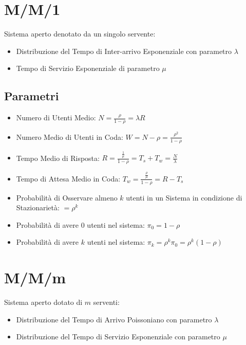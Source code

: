 
\section{M/M/1}

Sistema aperto denotato da un singolo servente:

\begin{itemize}
    \item Distribuzione del Tempo di Inter-arrivo Esponenziale con parametro
          $\lambda$
    \item Tempo di Servizio Esponenziale di parametro $\mu$
\end{itemize}

\subsection{Parametri}

\begin{itemize}
    \item Numero di Utenti Medio: $N = \frac{\rho}{1 - \rho} = \lambda R$
    \item Numero Medio di Utenti in Coda: $W = N - \rho = \frac{\rho^2}{1-\rho}$
    \item Tempo Medio di Risposta: $R = \frac{\frac{1}{\mu}}{1 - \rho} = T_s +
              T_w = \frac{N}{\lambda}$
    \item Tempo di Attesa Medio in Coda: $T_w = \frac{\frac{\rho}{\mu}}{1 -
                  \rho} = R - T_s$
    \item Probabilità di Osservare almeno $k$ utenti in un Sistema in condizione
          di Stazionarietà: $ = \rho^k$
    \item Probabilità di avere $0$ utenti nel sistema: $\pi_0 = 1 - \rho$
    \item Probabilità di avere $k$ utenti nel sistema: $\pi_k = \rho^k \pi_0 =
              \rho^k (1 - \rho)$
\end{itemize}

\section{M/M/m}

Sistema aperto dotato di $m$ serventi:

\begin{itemize}
    \item Distribuzione del Tempo di Arrivo Poissoniano con parametro $\lambda$
    \item Distribuzione del Tempo di Servizio Esponenziale con parametro $\mu$
\end{itemize}

